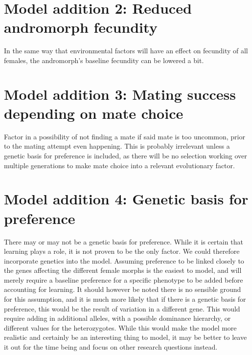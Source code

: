 \documentclass{article}
\begin{document}
\section{Model addition 2: Reduced andromorph fecundity}
In the same way that environmental factors will have an effect on fecundity of all females, the andromorph's baseline fecundity can be lowered a bit.


\section{Model addition 3: Mating success depending on mate choice}
Factor in a possibility of not finding a mate if said mate is too uncommon, prior to the mating attempt even happening. This is probably irrelevant unless a genetic basis for preference is included, as there will be no selection working over multiple generations to make mate choice into a relevant evolutionary factor.

\section{Model addition 4: Genetic basis for preference}
There may or may not be a genetic basis for preference. While it is certain that learning plays a role, it is not proven to be the only factor. We could therefore incorporate genetics into the model. Assuming preference to be linked closely to the genes affecting the different female morphs is the easiest to model, and will merely require a baseline preference for a specific phenotype to be added before accounting for learning. It should however be noted there is no sensible ground for this assumption, and it is much more likely that if there is a genetic basis for preference, this would be the result of variation in a different gene. This would require adding in additional alleles, with a possible dominance hierarchy, or different values for the heterozygotes. While this would make the model more realistic and certainly be an interesting thing to model, it may be better to leave it out for the time being and focus on other research questions instead.
\end{document}
